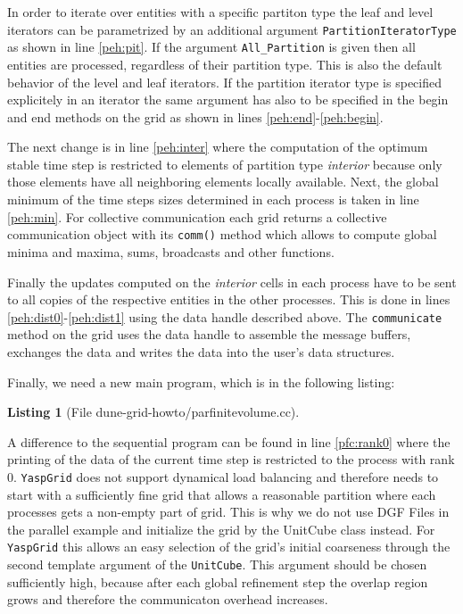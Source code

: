 \documentclass[11pt,a4paper,headinclude,footinclude,DIV16,headings=normal]{scrreprt}
\newtheorem{lst}{Listing}
\begin{document}
In order to iterate over entities with a specific partiton type the
leaf and level iterators can be parametrized by an additional argument
\lstinline!PartitionIteratorType! as shown in line \ref{peh:pit}. If
the argument \lstinline!All_Partition! is given then all entities are
processed, regardless of their partition type. This is also the
default behavior of the level and leaf iterators. If the partition
iterator type is specified explicitely in an iterator the same
argument has also to be specified in the begin and end methods on the
grid as shown in lines \ref{peh:end}-\ref{peh:begin}.

The next change is in line \ref{peh:inter} where the computation of
the optimum stable time step is restricted to elements of partition
type \textit{interior} because only those elements have all neighboring
elements locally available. Next, the global minimum of the time steps
sizes determined in each process is taken in line \ref{peh:min}. For
collective communication each grid returns a collective communication
object with its \lstinline!comm()! method which allows to compute
global minima and maxima, sums, broadcasts and other functions.

Finally the updates computed on the \textit{interior} cells in each
process have to be sent to all copies of the respective entities in
the other processes. This is done in lines
\ref{peh:dist0}-\ref{peh:dist1} using the data handle described above.
The \lstinline!communicate! method on the grid uses the data handle to
assemble the message buffers, exchanges the data and writes the data
into the user's data structures.

Finally, we need a new main program, which is in the following listing:

\begin{lst}[File dune-grid-howto/parfinitevolume.cc] \mbox{}
\nopagebreak

\end{lst}

A difference to the sequential program can be found in line
\ref{pfc:rank0} where the printing of the data of the current time
step is restricted to the process with rank 0.
\lstinline!YaspGrid! does not support dynamical load balancing and therefore
needs to start with a sufficiently fine grid that allows a reasonable partition
where each processes gets a non-empty part of grid. This is why we do not use
DGF Files in the parallel example and initialize the grid by the UnitCube class
instead. For \lstinline!YaspGrid! this allows an easy selection of the grid's
initial coarseness through the second template argument of the
\lstinline!UnitCube!. This argument should be chosen sufficiently high, because
after each global refinement step the overlap region grows and therefore the
communicaton overhead increases.
\end{document}
